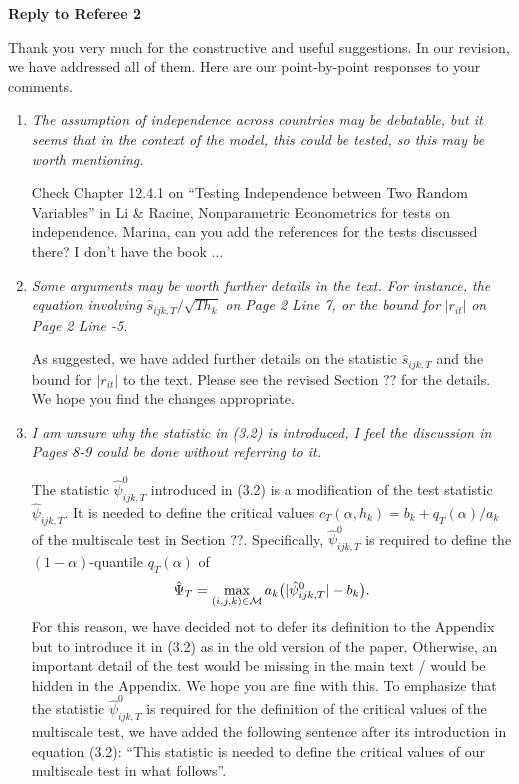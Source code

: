 \documentclass[a4paper,12pt]{article}
\begin{document}
\newpage
\begin{center}
{\large \bf Reply to Referee 2} 
\end{center}


Thank you very much for the constructive and useful suggestions. In our revision, we have addressed all of them. Here are our point-by-point responses to your comments. 


\begin{enumerate}[label=(\arabic*),leftmargin=0.7cm]

\item \textit{The assumption of independence across countries may be debatable, but it seems that in the context of the model, this could be tested, so this may be worth mentioning.}

{\color{red} Check Chapter 12.4.1 on ``Testing Independence between Two Random Variables'' in Li \& Racine, Nonparametric Econometrics for tests on independence. Marina, can you add the references for the tests discussed there? I don't have the book ...} 


\item \textit{Some arguments may be worth further details in the text. For instance, the equation involving} $\hat{s}_{ijk,T} / \sqrt{T h_k}$ \textit{on Page 2 Line 7, or the bound for} $|r_{it}|$ \textit{on Page 2 Line -5.}

As suggested, we have added further details on the statistic $\hat{s}_{ijk,T}$ and the bound for $|r_{it}|$ to the text. Please see the revised Section ?? for the details. We hope you find the changes appropriate.  


\item \textit{I am unsure why the statistic in (3.2) is introduced, I feel the discussion in Pages 8-9 could be done without referring to it.}

The statistic $\hat{\psi}_{ijk,T}^0$ introduced in (3.2) is a modification of the test statistic $\hat{\psi}_{ijk,T}$. It is needed to define the critical values $c_T(\alpha,h_k) = b_k + q_T(\alpha) / a_k$ of the multiscale test in Section ??. Specifically, $\hat{\psi}_{ijk,T}^0$ is required to define the $(1-\alpha)$-quantile $q_T(\alpha)$ of 
\[ \hat{\Psi}_T = \max_{(i,j,k) \in \mathcal{M}} a_k \big( |\hat{\psi}_{ijk,T}^0| - b_k \big). \]
For this reason, we have decided not to defer its definition to the Appendix but to introduce it in (3.2) as in the old version of the paper. Otherwise, an important detail of the test would be missing in the main text / would be hidden in the Appendix. We hope you are fine with this. To emphasize that the statistic $\hat{\psi}_{ijk,T}^0$ is required for the definition of the critical values of the multiscale test, we have added the following sentence after its introduction in equation (3.2): ``This statistic is needed to define the critical values of our multiscale test in what follows''.



\end{enumerate}
\end{document}
